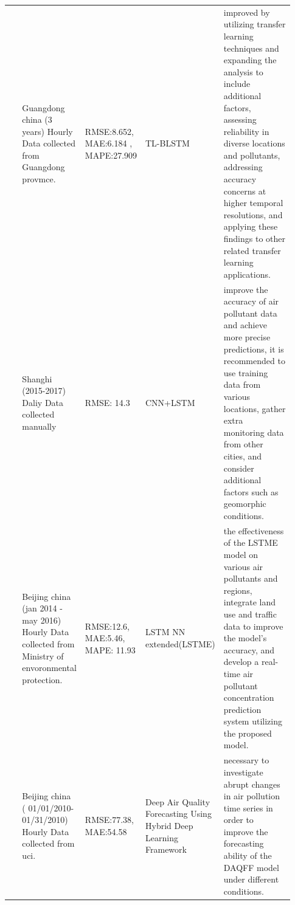 \documentclass[a4paper,fleqn]{cas-dc}
\begin{document}
\begin{landscape}
{\begin{longtable}[h!]{ p{0.1\linewidth} p{0.2\linewidth} p{0.14\linewidth} p{0.11\linewidth} p{0.38\linewidth} }
 \cite{ma2019improving}               & Guangdong china (3 years) Hourly   Data collected from Guangdong  provmce.                               & RMSE:8.652, MAE:6.184 ,   MAPE:27.909                                                                   & TL-BLSTM                                                            & improved by utilizing transfer learning techniques and expanding the analysis to include additional factors, assessing reliability in diverse locations and pollutants, addressing accuracy concerns at higher temporal resolutions, and applying these findings to other related transfer learning applications.                                                             \\
\cite{qin2019novel}       & Shanghi (2015-2017) Daliy Data collected   manually                                                      & RMSE: 14.3                                                                                              & CNN+LSTM                                                            &  improve the accuracy of air pollutant data and achieve more precise predictions, it is recommended to use training data from various locations, gather extra monitoring data from other cities, and consider additional factors such as geomorphic conditions.                                                   \\
 \cite{li2017long}          & Beijing china (jan 2014 -may   2016) Hourly Data collected from Ministry of envoronmental protection.    & RMSE:12.6, MAE:5.46, MAPE: 11.93                                                                        & LSTM NN extended(LSTME)                                             &the effectiveness of the LSTME model on various air pollutants and regions, integrate land use and traffic data to improve the model's accuracy, and develop a real-time air pollutant concentration prediction system utilizing the proposed model.                                           \\
 \cite{du2019deep}         & Beijing china (   01/01/2010-01/31/2010) Hourly Data collected from uci.                                 & RMSE:77.38, MAE:54.58                                                                                   & Deep Air Quality Forecasting   Using Hybrid Deep Learning Framework & necessary to investigate abrupt changes in air pollution time series in order to improve the forecasting ability of the DAQFF model under different conditions.                                                   \\

\end{longtable}}
\end{landscape}
\end{document}
